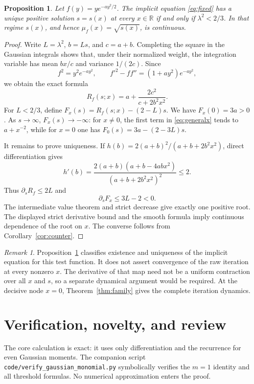 \documentclass[11pt]{article}
\newtheorem{proposition}[theorem]{Proposition}
\theoremstyle{remark}
\newtheorem{remark}[theorem]{Remark}
\newcommand{\R}{\mathbb R}
\begin{document}
\begin{proposition}\label{prop:global}
Let $f(y)=y e^{-a y^2/2}$.  The implicit equation \eqref{eq:fixed} has a unique
positive solution $s=s(x)$ at every $x\in\R$ if and only if
$\lambda^2<2/3$.  In that regime $s(x)$, and hence $\mu_f(x)=\sqrt{s(x)}$, is
continuous.
\end{proposition}

\begin{proof}
Write $L=\lambda^2$, $b=Ls$, and $c=a+b$.  Completing the square in the
Gaussian integrals shows that, under their normalized weight, the integration
variable has mean $bx/c$ and variance $1/(2c)$.  Since
\[
 f^2=y^2e^{-ay^2},
 \qquad f'^2-ff''=(1+ay^2)e^{-ay^2},
\]
we obtain the exact formula
\begin{equation}\label{eq:generalx}
 R_f(s;x)=a+\frac{2c^2}{c+2b^2x^2}.
\end{equation}
For $L<2/3$, define
$F_x(s)=R_f(s;x)-(2-L)s$.  We have $F_x(0)=3a>0$.  As $s\to\infty$,
$F_x(s)\to-\infty$: for $x\neq0$, the first term in \eqref{eq:generalx}
tends to $a+x^{-2}$, while for $x=0$ one has
$F_0(s)=3a-(2-3L)s$.

It remains to prove uniqueness.  If
$h(b)=2(a+b)^2/(a+b+2b^2x^2)$, direct differentiation gives
\[
 h'(b)=
 \frac{2(a+b)(a+b-4abx^2)}{(a+b+2b^2x^2)^2}\leq2.
\]
Thus $\partial_sR_f\leq2L$ and
\[
 \partial_sF_x\leq3L-2<0.
\]
The intermediate value theorem and strict decrease give exactly one positive
root.  The displayed strict derivative bound and the smooth formula imply
continuous dependence of the root on $x$.  The converse follows from
Corollary~\ref{cor:counter}.
\end{proof}

\begin{remark}
Proposition~\ref{prop:global} classifies existence and uniqueness of the
implicit equation for this test function.  It does not assert convergence of
the raw iteration at every nonzero $x$.  The derivative of that map need not be
a uniform contraction over all $x$ and $s$, so a separate dynamical argument
would be required.  At the decisive node $x=0$, Theorem~\ref{thm:family} gives
the complete iteration dynamics.
\end{remark}

\section{Verification, novelty, and review}

The core calculation is exact: it uses only differentiation and the recurrence
for even Gaussian moments.  The companion script
\texttt{code/verify\_gaussian\_monomial.py} symbolically verifies the $m=1$
identity and all threshold formulas.  No numerical approximation enters the
proof.
\end{document}
